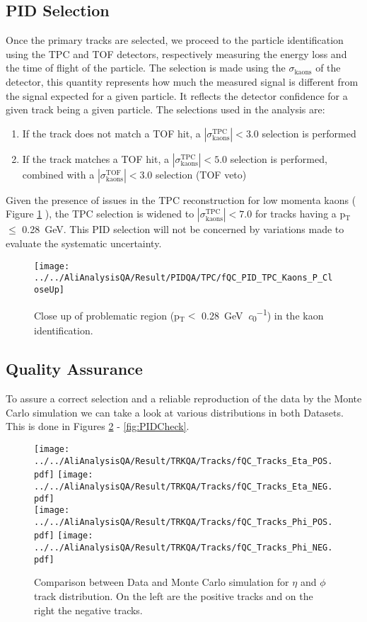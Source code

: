 \subsection{PID Selection}
Once the primary tracks are selected, we proceed to the particle identification using the TPC and TOF detectors, respectively measuring the energy loss and the time of flight of the particle. The selection is made using the $\sigma_{\text{kaons}}$ of the detector, this quantity represents how much the measured signal is different from the signal expected for a given particle. It reflects the detector confidence for a given track being a given particle. The selections used in the analysis are:
\begin{enumerate}
\item If the track does not match a TOF hit, a $|\sigma_{\text{kaons}}^{\text{TPC}}| < 3.0$ selection is performed
\item If the track matches a TOF hit, a $|\sigma_{\text{kaons}}^{\text{TPC}}| < 5.0$ selection is performed, combined with a $|\sigma_{\text{kaons}}^{\text{TOF}}| < 3.0$ selection (TOF veto)
\end{enumerate}
Given the presence of issues in the TPC reconstruction for low momenta kaons ( Figure \ref{fig:TPClowcheck} ), the TPC selection is widened to $|\sigma_{\text{kaons}}^{\text{TPC}}| < 7.0$ for tracks having a 
p$_{\text{T}}$$ \leq$ \SI{0.28}{\giga\electronvolt}. This PID selection will not be concerned by variations made to evaluate the systematic uncertainty.

\begin{figure}
\texttt{[image: ../../AliAnalysisQA/Result/PIDQA/TPC/fQC\_PID\_TPC\_Kaons\_P\_CloseUp]}
\caption{Close up of problematic region (p$_{\text{T}} <$ \SI{0.28}{\giga\electronvolt\per\clight}) in the kaon identification.}
\label{fig:TPClowcheck}
\end{figure}

\subsection{Quality Assurance}
To assure a correct selection and a reliable reproduction of the data by the Monte Carlo simulation we can take a look at various distributions in both Datasets. This is done in Figures \ref{fig:EtaPhiCheck} - \ref{fig:PIDCheck}.

\begin{figure}
\texttt{[image: ../../AliAnalysisQA/Result/TRKQA/Tracks/fQC\_Tracks\_Eta\_POS.pdf]}
\texttt{[image: ../../AliAnalysisQA/Result/TRKQA/Tracks/fQC\_Tracks\_Eta\_NEG.pdf]}\\
\texttt{[image: ../../AliAnalysisQA/Result/TRKQA/Tracks/fQC\_Tracks\_Phi\_POS.pdf]}
\texttt{[image: ../../AliAnalysisQA/Result/TRKQA/Tracks/fQC\_Tracks\_Phi\_NEG.pdf]}
\caption{Comparison between Data and Monte Carlo simulation for $\eta$ and $\phi$ track distribution. On the left are the positive tracks and on the right the negative tracks.}
\label{fig:EtaPhiCheck}
\end{figure}

